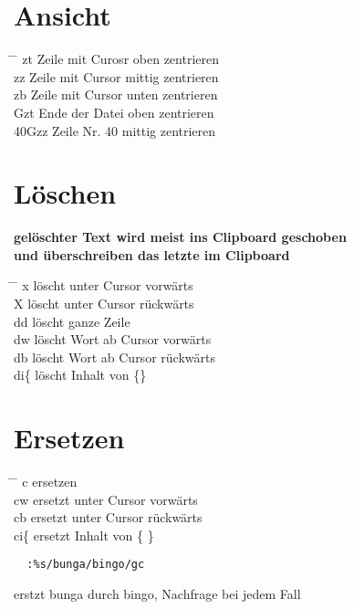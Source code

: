 \documentclass[a4paper,11pt,twoside]{article}
\begin{document}
\section*{Ansicht}
\begin{tabbing}
  \hspace{3mm} \= \hspace{20mm} \= \kill
  \> zt \> Zeile mit Curosr oben zentrieren \\ 
  \> zz \> Zeile mit Cursor mittig zentrieren \\ 
  \> zb \> Zeile mit Cursor unten zentrieren \\
  \> Gzt \> Ende der Datei oben zentrieren \\ 
  \> 40Gzz \> Zeile Nr. 40 mittig zentrieren \\
\end{tabbing}

\section*{Löschen}
  \textbf{gelöschter Text wird meist ins Clipboard geschoben} \\ 
  \textbf{und überschreiben das letzte im Clipboard} \\
\begin{tabbing}
  \hspace{3mm} \= \hspace{20mm} \= \kill
  \> x \> löscht unter Cursor vorwärts \\
  \> X \> löscht unter Cursor rückwärts \\
  \> dd \> löscht ganze Zeile \\
  \> dw \> löscht Wort ab Cursor vorwärts \\
  \> db \> löscht Wort ab Cursor rückwärts \\
  \> di\{ \> löscht Inhalt von \{\} \\
\end{tabbing}

\section*{Ersetzen}
\begin{tabbing}
  \hspace{3mm} \= \hspace{20mm} \= \kill
  \> c \> ersetzen \\ 
  \> cw \> ersetzt unter Cursor vorwärts \\ 
  \> cb \> ersetzt unter Cursor rückwärts \\
  \> ci\{ \> ersetzt Inhalt von \{ \}
\end{tabbing}
\begin{verbatim} 
  :%s/bunga/bingo/gc
\end{verbatim}  
  erstzt bunga durch bingo, Nachfrage bei jedem Fall \\ 
\end{document}
